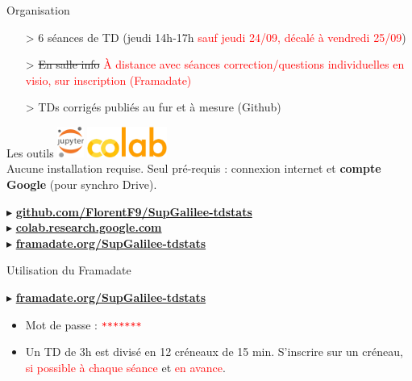 \documentclass{beamer}
\begin{document}
  \begin{frame}{Organisation}

    \begin{itemize}
      \item[>] 6 séances de TD (jeudi 14h-17h \small{\textcolor{red}{sauf jeudi 24/09, décalé à vendredi 25/09}})
      \item[>] \sout{En salle info} \textcolor{red}{À distance avec séances correction/questions individuelles en visio, sur inscription (Framadate)}
      \item[>] TDs corrigés publiés au fur et à mesure (Github)
    \end{itemize}

    \begin{block}{Les outils}
      \centering
      \includegraphics[height=1cm]{./rc/jupyter.png}\;
      \includegraphics[height=1cm]{./rc/colab.png}\\
      Aucune installation requise. Seul pré-requis : connexion internet et \textbf{compte Google} (pour synchro Drive).
    \end{block}

    $\blacktriangleright$ \textbf{\href{https://github.com/FlorentF9/SupGalilee-tdstats}{github.com/FlorentF9/SupGalilee-tdstats}}\\
    $\blacktriangleright$ \textbf{\href{https://colab.research.google.com}{colab.research.google.com}}\\
    $\blacktriangleright$ \textbf{\href{https://framadate.org/SupGalilee-tdstats}{framadate.org/SupGalilee-tdstats}}
    
  \end{frame}

  \begin{frame}{Utilisation du Framadate}

    \begin{center}
      $\blacktriangleright$ \textbf{\href{https://framadate.org/SupGalilee-tdstats}{framadate.org/SupGalilee-tdstats}}
    \end{center}

    \begin{itemize}
      \item Mot de passe : \textcolor{red}{\texttt{*******}}
      \item Un TD de 3h est divisé en 12 créneaux de 15 min. S'inscrire sur un créneau, \textcolor{red}{si possible à chaque séance} et \textcolor{red}{en avance}.
    \end{itemize}

  \end{frame}
\end{document}
